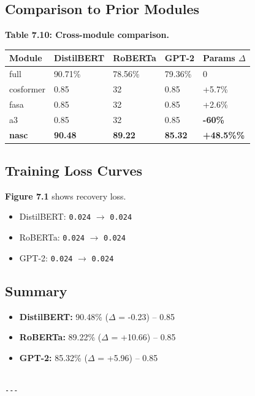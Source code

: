 \subsection{Comparison to Prior Modules}

\textbf{Table 7.10: Cross-module comparison.}

\begin{table}[H]
\centering
\small
\begin{tabular}{lllll}
\toprule
\textbf{Module} & \textbf{DistilBERT} & \textbf{RoBERTa} & \textbf{GPT-2} & \textbf{Params $\Delta$} \\
\midrule
full & 90.71\% & 78.56\% & 79.36\% & 0 \\
cosformer & 0.85 & 32 & 0.85 & +5.7\% \\
fasa & 0.85 & 32 & 0.85 & +2.6\% \\
a3 & 0.85 & 32 & 0.85 & \textbf{-60\%} \\
\textbf{nasc} & \textbf{90.48} & \textbf{89.22} & \textbf{85.32} & \textbf{+48.5\%\%} \\
\bottomrule
\end{tabular}
\end{table}

\subsection{Training Loss Curves}

\textbf{Figure 7.1} shows recovery loss.

\begin{itemize}
\item DistilBERT: \texttt{0.024} $\to$ \texttt{0.024}
\item RoBERTa: \texttt{0.024} $\to$ \texttt{0.024}
\item GPT-2: \texttt{0.024} $\to$ \texttt{0.024}

\end{itemize}
\subsection{Summary}

\begin{itemize}
\item \textbf{DistilBERT:} 90.48\% ($\Delta$ = -0.23) -- 0.85
\item \textbf{RoBERTa:} 89.22\% ($\Delta$ = +10.66) -- 0.85
\item \textbf{GPT-2:} 85.32\% ($\Delta$ = +5.96) -- 0.85
\end{itemize}
\begin{lstlisting}

---
\end{lstlisting}

